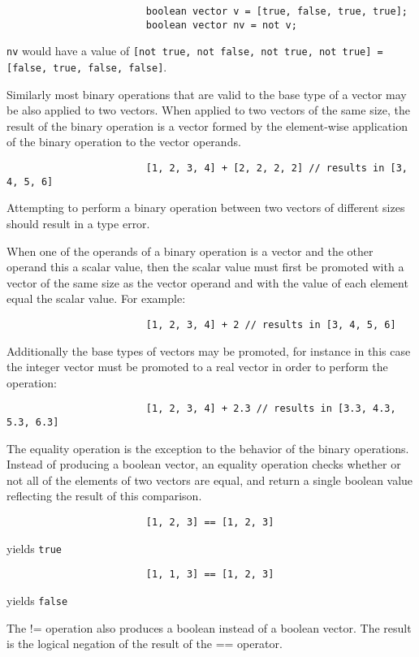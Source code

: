 \documentclass[../../gazprea.tex]{subfiles}
\begin{document}
\begin{enumerate}
					\begin{lstlisting}
						boolean vector v = [true, false, true, true];
						boolean vector nv = not v;
					\end{lstlisting}

					\texttt{nv} would have a value of \texttt{[not true, not false, not true, not true] = [false, true,
					false, false]}.

					Similarly most binary operations that are valid to the base type of a vector may be also applied to
					two vectors. When applied to two vectors of the same size, the result of the binary operation is a
					vector formed by the element-wise application of the binary operation to the vector operands.

					\begin{lstlisting}
						[1, 2, 3, 4] + [2, 2, 2, 2] // results in [3, 4, 5, 6]
					\end{lstlisting}

					Attempting to perform a binary operation between two vectors of different sizes should result in a
					type error.

					When one of the operands of a binary operation is a vector and the other operand this a scalar
					value, then the scalar value must first be promoted with a vector of the same size as the vector
					operand and with the value of each element equal the scalar value. For example:

					\begin{lstlisting}
						[1, 2, 3, 4] + 2 // results in [3, 4, 5, 6]
					\end{lstlisting}

					Additionally the base types of vectors may be promoted, for instance in this case the integer vector
					must be promoted to a real vector in order to perform the operation:

					\begin{lstlisting}
						[1, 2, 3, 4] + 2.3 // results in [3.3, 4.3, 5.3, 6.3]
					\end{lstlisting}

					The equality operation is the exception to the behavior of the binary operations. Instead of
					producing a boolean vector, an equality operation checks whether or not all of the elements of two
					vectors are equal, and return a single boolean value reflecting the result of this comparison.

					\begin{lstlisting}
						[1, 2, 3] == [1, 2, 3]
					\end{lstlisting}

					yields \texttt{true}

					\begin{lstlisting}
						[1, 1, 3] == [1, 2, 3]
					\end{lstlisting}

					yields \texttt{false}

					The != operation also produces a boolean instead of a boolean vector. The result is the logical
					negation of the result of the == operator.
			\end{enumerate}
\end{document}
